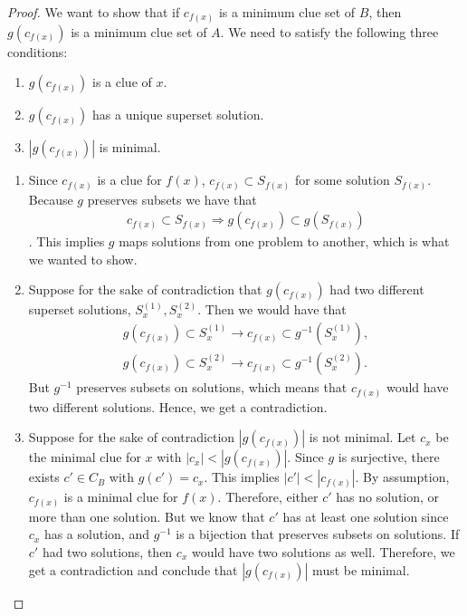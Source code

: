 \documentclass[runningheads,a4paper]{llncs}
\begin{document}
\begin{proof}
We want to show that if $c_{f(x)}$ is a minimum clue set of $B$, then $g(c_{f(x)})$ is a minimum clue set of $A$. We need to satisfy the following three conditions:
\begin{enumerate}
\item $g(c_{f(x)})$ is a clue of $x$. 
\item $g(c_{f(x)})$ has a unique superset solution.
\item $|g(c_{f(x)})|$ is minimal.
\end{enumerate}

\begin{enumerate}
\item Since $c_{f(x)}$ is a clue for $f(x)$, $c_{f(x)} \subset S_{f(x)}$ for some solution $S_{f(x)}$. Because $g$ preserves subsets we have that 
\begin{align*} c_{f(x)} \subset S_{f(x)} \Rightarrow g(c_{f(x)}) \subset g(S_{f(x)}) \end{align*}.
This implies $g$ maps solutions from one problem to another, which is what we wanted to show. 
\item Suppose for the sake of contradiction that $g(c_{f(x)})$ had two different superset solutions, $S_x^{(1)}, S_x^{(2)}$. Then we would have that
\begin{align*}
g(c_{f(x)}) \subset S_x^{(1)} \rightarrow c_{f(x)} \subset g^{-1}(S_x^{(1)}) , \\
g(c_{f(x)}) \subset S_x^{(2)} \rightarrow c_{f(x)} \subset g^{-1}(S_x^{(2)}).
\end{align*}
But $g^{-1}$ preserves subsets on solutions, which means that $c_{f(x)}$ would have two different solutions. Hence, we get a contradiction. 
\item Suppose for the sake of contradiction $|g(c_{f(x)})|$ is not minimal. Let $c_x$ be the minimal clue for $x$ with $|c_x| < |g(c_{f(x)})|$. Since $g$ is surjective, there exists $c' \in C_B$ with $g(c') = c_x$. This implies $|c'| < |c_{f(x)}|$. By assumption, $c_{f(x)}$ is a minimal clue for $f(x)$. Therefore, either $c'$ has no solution, or more than one solution. But we know that $c'$ has at least one solution since $c_x$ has a solution, and $g^{-1}$ is a bijection that preserves subsets on solutions. If $c'$ had two solutions, then $c_x$ would have two solutions as well. Therefore, we get a contradiction and conclude that $|g(c_{f(x)})|$ must be minimal.
\end{enumerate}
\end{proof}
\end{document}
